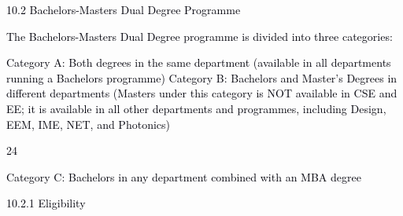 \documentclass[12pt]{article}
\begin{document}
\vspace{\baselineskip}
\textcolor[HTML]{00000A}{10.2 Bachelors-Masters Dual Degree Programme}\par


\vspace{\baselineskip}
{\fontsize{10pt}{12.0pt}\selectfont \textcolor[HTML]{00000A}{The Bachelors-Masters Dual Degree programme is divided into three categories:}\par}\par


\vspace{\baselineskip}
\begin{adjustwidth}{0.0in}{0.21in}
{\fontsize{9pt}{10.8pt}\selectfont \textcolor[HTML]{00000A}{Category A: Both degrees in the same department (available in all departments running a Bachelors programme) Category B: Bachelors and Master’s Degrees in different departments (Masters under this category is NOT available in CSE and EE; it is available in all other departments and programmes, including Design, EEM, IME, NET, and Photonics)}\par}\par

\end{adjustwidth}


\vspace{\baselineskip}
\begin{Center}
\textcolor[HTML]{00000A}{24}
\end{Center}\par


\vspace{\baselineskip}
{\fontsize{10pt}{12.0pt}\selectfont \textcolor[HTML]{00000A}{Category C: Bachelors in any department combined with an MBA degree}\par}\par


\vspace{\baselineskip}
{\fontsize{10pt}{12.0pt}\selectfont \textcolor[HTML]{00000A}{10.2.1 Eligibility}\par}\par
\end{document}
